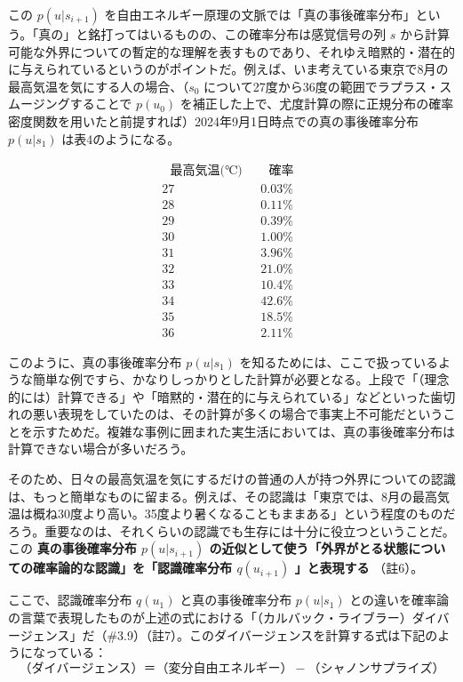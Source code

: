 この \(p(u|s_{i+1})\)
を\mbox{自由エネルギー原理}の文脈では「真の事後確率分布」という。「真の」と銘打ってはいるものの、この確率分布は感覚信号の列
\(s\)
から計算可能な外界についての暫定的な理解を表すものであり、それゆえ暗黙的・潜在的に与えられているというのがポイントだ。例えば、いま考えている東京で8月の最高気温を気にする人の場合、（\(s_0\)
について27度から36度の範囲でラプラス・スムージングすることで \(p(u_0)\)
を補正した上で、尤度計算の際に正規分布の確率密度関数を用いたと前提すれば）2024年9月1日時点での真の事後確率分布
\(p(u|s_1)\) は表4のようになる。

\[
\begin{array}{cc}
~~~\textrm{最高気温(℃)}~~~ & ~~~\textrm{確率}~~~ \\
\hline
\textrm{27} & \textrm{0.03\%} \\
\textrm{28} & \textrm{0.11\%} \\
\textrm{29} & \textrm{0.39\%} \\
\textrm{30} & \textrm{1.00\%} \\
\textrm{31} & \textrm{3.96\%} \\
\textrm{32} & \textrm{21.0\%} \\
\textrm{33} & \textrm{10.4\%} \\
\textrm{34} & \textrm{42.6\%} \\
\textrm{35} & \textrm{18.5\%} \\
\textrm{36} & \textrm{2.11\%}
\end{array}
\tag{表4}
\]

このように、真の事後確率分布 \(p(u|s_1)\)
を知るためには、ここで扱っているような簡単な例ですら、かなりしっかりとした計算が必要となる。上段で「（理念的には）計算できる」や「暗黙的・潜在的に与えられている」などといった歯切れの悪い表現をしていたのは、その計算が多くの場合で事実上不可能だということを示すためだ。複雑な事例に囲まれた実生活においては、真の事後確率分布は計算できない場合が多いだろう。

そのため、日々の最高気温を気にするだけの普通の人が持つ外界についての認識は、もっと簡単なものに留まる。例えば、その認識は「東京では、8月の最高気温は概ね30度より高い。35度より暑くなることもままある」という程度のものだろう。重要なのは、それくらいの認識でも生存には十分に役立つということだ。この
\textbf{真の事後確率分布 \(p(u|s_{i+1})\)
の近似として使う「外界がとる状態についての確率論的な認識」を「認識確率分布
\(q(u_{i+1})\) 」と表現する} （註6）。

ここで、認識確率分布 \(q(u_1)\) と真の事後確率分布 \(p(u|s_1)\)
との違いを確率論の言葉で表現したものが上述の式における「（カルバック・ライブラー）ダイバージェンス」だ（\#3.9）（註7）。このダイバージェンスを計算する式は下記のようになっている：
\[
（ダイバージェンス）＝（変分自由エネルギー）-（シャノンサプライズ）\tag{2}
\]

